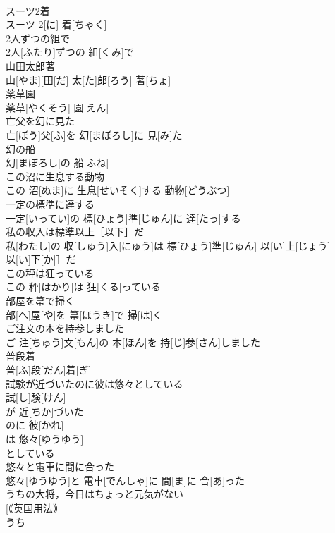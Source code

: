 \documentclass[8pt]{extreport}
\begin{document}
\begin{CJK}{UTF8}{min}
\\	スーツ2着	
\\	スーツ 2[に] 着[ちゃく]
\\	2人ずつの組で	
\\	2人[ふたり]ずつの 組[くみ]で
\\	山田太郎著	
\\	山[やま][田[だ] 太[た]郎[ろう] 著[ちょ]
\\	薬草園	
\\	薬草[やくそう] 園[えん]
\\	亡父を幻に見た	
\\	亡[ぼう]父[ふ]を 幻[まぼろし]に 見[み]た
\\	幻の船	
\\	幻[まぼろし]の 船[ふね]
\\	この沼に生息する動物	
\\	この 沼[ぬま]に 生息[せいそく]する 動物[どうぶつ]
\\	一定の標準に達する	
\\	一定[いってい]の 標[ひょう]準[じゅん]に 達[たっ]する
\\	私の収入は標準以上［以下］だ	
\\	私[わたし]の 収[しゅう]入[にゅう]は 標[ひょう]準[じゅん] 以[い]上[じょう]
\\	以[い]下[か]］だ
\\	この秤は狂っている	
\\	この 秤[はかり]は 狂[くる]っている
\\	部屋を箒で掃く	
\\	部[へ]屋[や]を 箒[ほうき]で 掃[は]く
\\	ご注文の本を持参しました	
\\	ご 注[ちゅう]文[もん]の 本[ほん]を 持[じ]参[さん]しました
\\	普段着	
\\	普[ふ]段[だん]着[ぎ]
\\	試験が近づいたのに彼は悠々としている	
\\	試[し]験[けん]
\\	が 近[ちか]づいた 
\\	のに 彼[かれ]
\\	は 悠々[ゆうゆう]
\\	としている
\\	悠々と電車に間に合った	
\\	悠々[ゆうゆう]と 電車[でんしゃ]に 間[ま]に 合[あ]った
\\	うちの大将，今日はちょっと元気がない	
\\	[｟英国用法｠
\\	うち 

\end{CJK}
\end{document}
